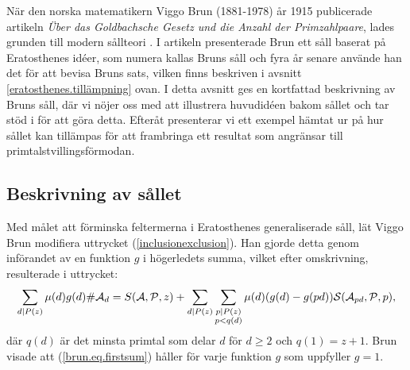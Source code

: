 \begin{comment}
När den norska matematikern Viggo Brun (1881-1978) år 1915 publicerade artikeln \textit{Über das Goldbachsche Gesetz und die Anzahl der Primzahlpaare}, lades grunden till modern sållteori \cite{ViggoBrun}. 
I artikeln presenterade Brun ett såll baserat på Eratosthenes idéer, som numera kallas Bruns såll och fyra år senare använde han det för att bevisa att summan av reciproker $\frac{1}{p_1}+\frac{1}{p_2}+...$ av primtalstvillingar $p_1,p_2,...$ konvergerar \cite{ViggoBrun}.
I detta avsnitt ges en kortfattad beskrivning av Bruns såll och ett exempel taget ur \cite{cojocarumurty} på hur sållet kan tillämpas för att ge ett resultat som angränsar till primtalstvillingsförmodan.
\end{comment}

När den norska matematikern Viggo Brun (1881-1978) år 1915 publicerade artikeln \textit{Über das Goldbachsche Gesetz und die Anzahl der Primzahlpaare}, lades grunden till modern sållteori \cite{ViggoBrun}. 
I artikeln presenterade Brun ett såll baserat på Eratosthenes idéer, som numera kallas Bruns såll och fyra år senare använde han det för att bevisa Bruns sats, vilken finns beskriven i avsnitt \ref{eratosthenes.tillämpning} ovan.
I detta avsnitt ges en kortfattad beskrivning av Bruns såll, där vi nöjer oss med att illustrera huvudidéen bakom sållet och tar stöd i \cite[kap 6.2]{cojocarumurty} för att göra detta. Efteråt presenterar vi ett exempel hämtat ur \cite{cojocarumurty} på hur sållet kan tillämpas för att frambringa ett resultat som angränsar till primtalstvillingsförmodan.


\subsection{Beskrivning av sållet}
Med målet att förminska feltermerna i Eratosthenes generaliserade såll, lät Viggo Brun modifiera uttrycket (\ref{inclusionexclusion}). 
Han gjorde detta genom införandet av en funktion $g$ i högerledets summa, vilket efter omskrivning, resulterade i uttrycket:
\begin{equation}\label{brun.eq.firstsum}
    \sum_{d \mid P(z)} \mu(d) g(d) \# \mathcal{A}_d = S(\mathcal{A}, \mathcal{P}, z) + \sum_{d \mid P(z)} \sum_{\substack{p \mid P(z) \\ p<q(d)}} \mu(d) (g(d)-g(pd))\mathcal{S}(\mathcal{A}_{pd},\mathcal{P},p),
\end{equation}
där $q(d)$ är det minsta primtal som delar $d$ för $d\geq2$ och $q(1)=z+1$. Brun visade att (\ref{brun.eq.firstsum}) håller för varje funktion $g$ som uppfyller $g=1$.

